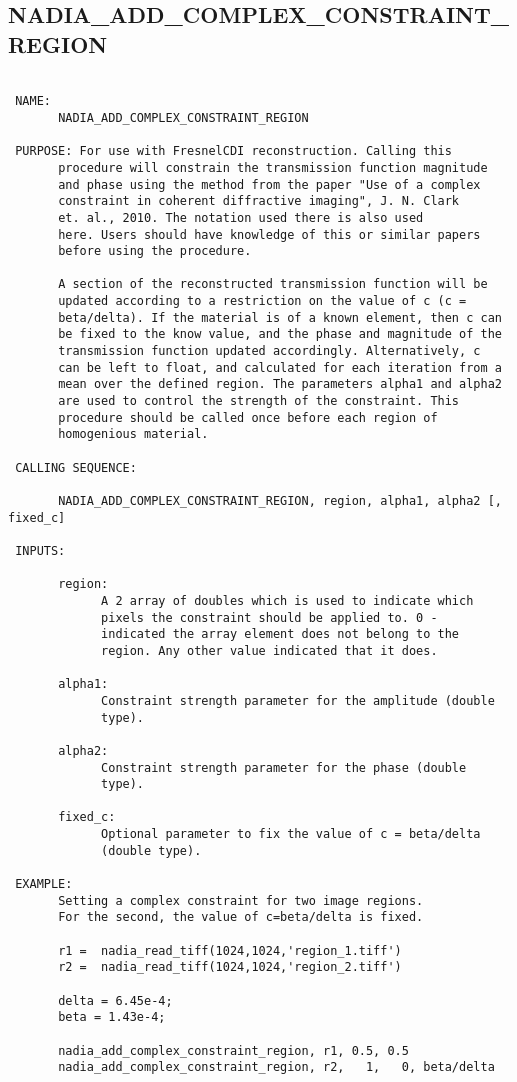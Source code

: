 
\subsection{NADIA\_ADD\_COMPLEX\_CONSTRAINT\_REGION}
\begin{verbatim}

 NAME:
       NADIA_ADD_COMPLEX_CONSTRAINT_REGION

 PURPOSE: For use with FresnelCDI reconstruction. Calling this
       procedure will constrain the transmission function magnitude
       and phase using the method from the paper "Use of a complex
       constraint in coherent diffractive imaging", J. N. Clark
       et. al., 2010. The notation used there is also used
       here. Users should have knowledge of this or similar papers
       before using the procedure.

       A section of the reconstructed transmission function will be
       updated according to a restriction on the value of c (c =
       beta/delta). If the material is of a known element, then c can
       be fixed to the know value, and the phase and magnitude of the
       transmission function updated accordingly. Alternatively, c
       can be left to float, and calculated for each iteration from a
       mean over the defined region. The parameters alpha1 and alpha2
       are used to control the strength of the constraint. This
       procedure should be called once before each region of
       homogenious material.

 CALLING SEQUENCE:

       NADIA_ADD_COMPLEX_CONSTRAINT_REGION, region, alpha1, alpha2 [, fixed_c]

 INPUTS:

       region:
             A 2 array of doubles which is used to indicate which
             pixels the constraint should be applied to. 0 -
             indicated the array element does not belong to the
             region. Any other value indicated that it does.

       alpha1:
             Constraint strength parameter for the amplitude (double
             type).

       alpha2:
             Constraint strength parameter for the phase (double
             type).
             
       fixed_c:
             Optional parameter to fix the value of c = beta/delta
             (double type).

 EXAMPLE:
       Setting a complex constraint for two image regions.
       For the second, the value of c=beta/delta is fixed.

       r1 =  nadia_read_tiff(1024,1024,'region_1.tiff')
       r2 =  nadia_read_tiff(1024,1024,'region_2.tiff')

       delta = 6.45e-4;
       beta = 1.43e-4;

       nadia_add_complex_constraint_region, r1, 0.5, 0.5
       nadia_add_complex_constraint_region, r2,   1,   0, beta/delta

\end{verbatim}



